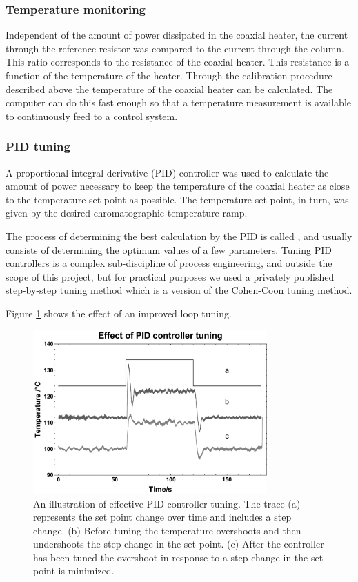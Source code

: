 \subsubsection{Temperature monitoring}

Independent of the amount of power dissipated in the coaxial heater, the current
through the reference resistor was compared to the current through the column.
This ratio corresponds to the resistance of the coaxial heater. This resistance
is a function of the temperature of the heater. Through the calibration
procedure described above the temperature of the coaxial heater can be
calculated. The computer can do this fast enough so that a temperature
measurement is available to continuously feed to a control system.

\subsubsection{PID tuning}

A proportional-integral-derivative (PID) controller was used to calculate the
amount of power necessary to keep the temperature of the coaxial heater as close
to the temperature set point as possible. The temperature set-point, in turn,
was given by the desired chromatographic temperature ramp.

The process of determining the best calculation by the PID is called
, and usually consists of determining the optimum values of a few
parameters. Tuning PID controllers is a complex sub-discipline of process
engineering, and outside the scope of this project, but for practical purposes
we used a privately published step-by-step tuning method \autocite{Peacock2008}
which is a version of the Cohen-Coon tuning method.

Figure \ref{fig:LoopTuning} shows the effect of an improved loop tuning. 

\begin{figure}
	\centering
	\includegraphics[width=0.8\textwidth]{Figures/LoopTuningGraph.pdf}
	\decoRule	
	\caption[Effect of controller tuning]{An illustration of effective PID
	controller tuning. The trace (a) represents the set point change over time and
	includes a step change. (b) Before tuning the temperature overshoots and then
	undershoots the step change in the set point. (c) After the controller has been
	tuned the overshoot in response to a step change in the set point is minimized. }
	\label{fig:LoopTuning} 
\end{figure}

